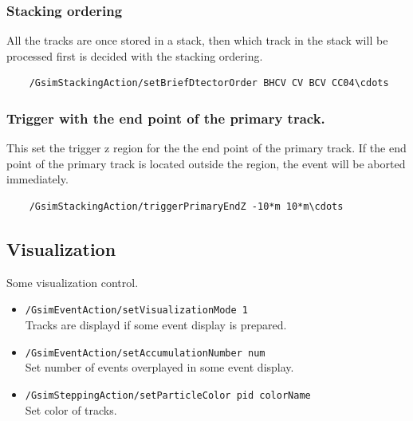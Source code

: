 \documentclass[a4paper,12pt]{article}
\begin{document}
   \subsubsection{Stacking ordering}
   All the tracks are once stored in a stack, then which track in the
   stack will be processed first is decided with the stacking ordering.
   \begin{screen}
    \begin{verbatim}
    /GsimStackingAction/setBriefDtectorOrder BHCV CV BCV CC04\cdots\end{verbatim}
   \end{screen}
   \subsubsection{Trigger with the end point of the primary track.}
   This set the trigger z region for the the end point of the primary
   track. 
   If the end point of the primary track is located outside the
   region, the event will be aborted immediately.
   \begin{screen}
    \begin{verbatim}
    /GsimStackingAction/triggerPrimaryEndZ -10*m 10*m\cdots\end{verbatim}
   \end{screen}
   
  \subsection{Visualization}
  Some visualization control.
  \begin{itemize}
   \item {\tt /GsimEventAction/setVisualizationMode 1}\\
	 Tracks are displayd if some event display is prepared.
   \item {\tt /GsimEventAction/setAccumulationNumber num}\\
	 Set number of events overplayed in some event display.
   \item {\tt /GsimSteppingAction/setParticleColor pid colorName}\\
	 Set color of tracks.
  \end{itemize}
  
\end{document}

